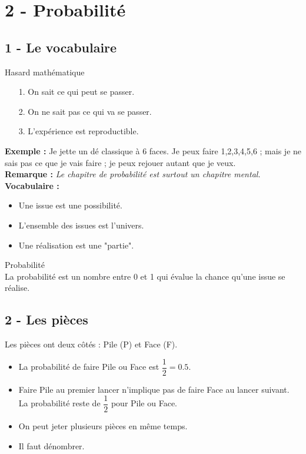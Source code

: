 



\section*{2 - Probabilité}

\subsection*{1 - Le vocabulaire}

\begin{Definition}{Hasard mathématique}
  \begin{enumerate}
    \item[1.] On sait ce qui peut se passer.
    \item[2.] On ne sait pas ce qui va se passer.
    \item[3.] L'expérience est reproductible.
  \end{enumerate}
\end{Definition}

\textbf{Exemple :} Je jette un dé classique à 6 faces. 
Je peux faire 1,2,3,4,5,6 ; mais je ne sais pas ce que je vais faire ; je peux rejouer autant que je veux. \\

\textbf{Remarque : } \textit{Le chapitre de probabilité est surtout un chapitre mental.} \\


\textbf{Vocabulaire : } 
\begin{itemize}[label={$\bullet$}]
  \item Une issue est une possibilité. 
  \item L'ensemble des issues est l'univers.
  \item Une réalisation est une "partie". 
\end{itemize}

\begin{Definition}{Probabilité}\\
  La probabilité est un nombre entre 0 et 1 qui évalue la chance qu'une issue se réalise. 
\end{Definition}

\subsection*{2 - Les pièces}

Les pièces ont deux côtés : Pile (P) et Face (F).
\begin{itemize}[label={$\bullet$}]
  \item La probabilité de faire Pile ou Face est $\dfrac{1}{2} = 0.5$.
  \item Faire Pile au premier lancer n'implique pas de faire Face au lancer suivant. La probabilité reste de $\dfrac{1}{2}$ pour Pile ou Face.
  \item On peut jeter plusieurs pièces en même temps.
  \item Il faut dénombrer. 
\end{itemize}

